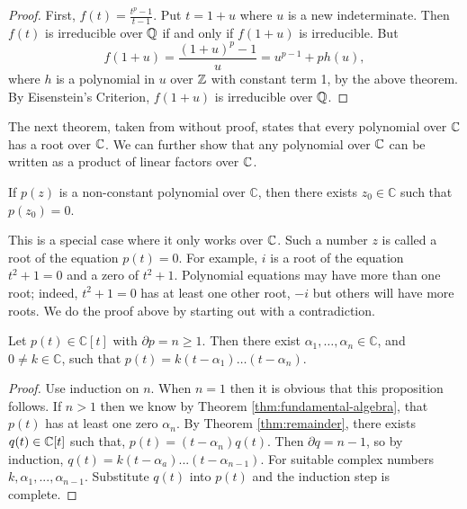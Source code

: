 \begin{proof}
First, $f(t) = \frac{t^p - 1}{t - 1}$. Put $t = 1 + u$ where $u$ is a new indeterminate. Then $f(t)$ is irreducible over $\mathbb Q$ if and only if $f(1+u)$ is irreducible. But
$$
f(1+u) = \frac{(1+u)^p - 1}{u}  = u^{p-1} + ph(u),
$$
where $h$ is a polynomial in $u$ over $\mathbb Z$ with constant term 1, by the above theorem. By Eisenstein's Criterion, $f(1+u)$ is irreducible over $\mathbb Q$.
\end{proof}


The next theorem, taken from \cite{complex-functions-uon} without proof, states that every polynomial over $\mathbb C$ has a root over $\mathbb C$. We can further show that any polynomial over $\mathbb C$ can be written as a product of linear factors over $\mathbb C$. 


\begin{theorem} \label{thm:fundamental-algebra}
	If $p(z)$ is a non-constant polynomial over $\mathbb{C}$, then there exists $z_0 \in \mathbb{C}$ such that $p\left(z_0\right)=0$.
\end{theorem}

This is a special case where it only works over $\mathbb C$. Such a number $z$ is called a root of the equation $p(t)=0$. For example, $i$ is a root of the equation $t^2+1=0$ and a zero of $t^2+1$. Polynomial equations may have more than one root; indeed, $t^2+1=0$ has at least one other root, $-i$ but others will have more roots. We do the proof above by starting out with a contradiction.

\begin{proposition}
	Let $p(t) \in \mathbb{C}[t]$ with $\partial p=n \geq 1$. Then there exist $\alpha_1, \ldots, \alpha_n \in \mathbb{C}$, and $0 \neq k \in \mathbb{C}$, such that
	$
	p(t)=k\left(t-\alpha_1\right) \ldots\left(t-\alpha_n\right).
	$
\end{proposition}

\begin{proof}
	Use induction on $n$. When $n = 1$ then it is obvious that this proposition follows. If $n > 1$ then we know by Theorem \ref{thm:fundamental-algebra}, that $p(t)$ has at least one zero $\alpha_n$. By Theorem \ref{thm:remainder}, there exists $q(t) \in \mathbb C[t]$ such that,
		$p(t) = (t-\alpha_n) q(t)$. 
	Then $\partial q = n - 1$, so by induction,
		$q(t) = k(t-\alpha_a)...(t-\alpha_{n-1})$. 
	For suitable complex numbers $k,\alpha_1,...,\alpha_{n-1}$. Substitute $q(t)$ into $p(t)$ and the induction step is complete.
\end{proof}